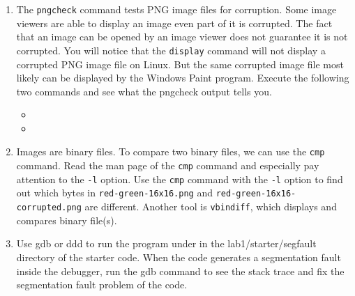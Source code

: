 \begin{enumerate}
    \item The \verb+pngcheck+ command tests PNG image files for corruption. Some image viewers are able to display an image even part of it is corrupted. The fact that an image can be opened by an image viewer does not guarantee it is not corrupted. You will notice that the \verb+display+ command will not display a corrupted PNG image file on Linux. But the same corrupted image file most likely can be displayed by the Windows Paint program. Execute the following two commands and see what the pngcheck output tells you.
      \begin{itemize}
      \item {}
      \item {}
      \end{itemize}
    \item Images are binary files. To compare two binary files, we can use the \verb+cmp+ command. Read the man page of the \verb+cmp+ command and especially pay attention to the \verb+-l+ option. Use the \verb+cmp+ command with the \verb+-l+ option to find out which bytes in \verb+red-green-16x16.png+ and \verb+red-green-16x16-corrupted.png+ are different. Another tool is \verb+vbindiff+, which displays and compares binary file(s).  
     \item Use gdb or ddd to run the program under in the lab1/starter/segfault directory of the starter code. When the code generates a segmentation fault inside the debugger, run the gdb command  to see the stack trace and fix the segmentation fault problem of the code. 
\end{enumerate}

